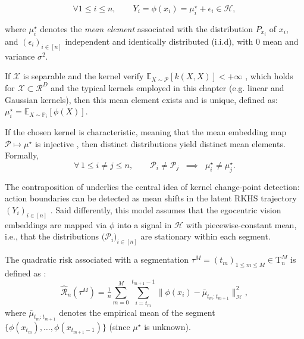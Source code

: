         \begin{equation}
            \forall 1 \leq i \leq n, \qquad Y_i = \phi(x_i) = \mu_i^\star + \epsilon_i \in \mathcal{H},
            \label{eq:latent_modeling}
        \end{equation}

        where $\mu_i^\star$ denotes the \textit{mean element} associated with the distribution $P_{x_i}$ of $x_i$, and $(\epsilon_i)_{i \in [n]}$ independent and identically distributed (i.i.d), with 0 mean and variance $\sigma^2$.

        If $\mathcal{X}$ is separable and the kernel verify $\mathbb{E}_{X \sim \mathcal{P}}[k(X,X)] < +\infty$ \cite{Ledoux1991}, which holds for $\mathcal{X} \subset \mathcal{R}^D$ and the typical kernels employed in this chapter (e.g. linear and Gaussian kernels), then this mean element exists and is unique, defined as: $\mu^\star_i = \mathbb{E}_{X \sim \mathbb{P}_{i}}[\phi(X)]$.   

        If the chosen kernel is characteristic, meaning that the mean embedding map $\mathcal{P} \mapsto \mu^\star$ is injective \cite{Sriperumbudur}, then distinct distributions yield distinct mean elements. Formally,
        \begin{equation}
            \forall\, 1 \leq i \neq j \leq n, 
            \qquad \mathcal{P}_{i} \neq \mathcal{P}_{j} 
            \;\; \implies \;\; \mu^\star_i \neq \mu^\star_j.
            \label{eq:injective}
        \end{equation}

        The contraposition of  underlies the central idea of kernel change-point detection: action boundaries can be detected as mean shifts in the latent RKHS trajectory $(Y_i)_{i \in [n]}$ \cite{cpt}. Said differently, this model assumes that the egocentric vision embeddings are mapped via $\phi$ into a signal in $\mathcal{H}$ with piecewise-constant mean, i.e., that the distributions $\big(\mathcal{P}_i \big)_{i \in [n]}$ are stationary within each segment.


        The quadratic risk associated with a segmentation $\tau^{M} = (t_m)_{1 \leq m \leq M} \in \mathrm{T}_n^M$ is defined as \cite{4301363}:
        \begin{equation}
            \hat{\mathcal{R}}_n(\tau^{M}) 
            = \tfrac{1}{n}\sum_{m=0}^M \sum_{i=t_m}^{t_{m+1}-1} 
            \big\| \phi(x_i) - \bar{\mu}_{t_m:t_{m+1}} \big\|_{\mathcal{H}}^2,
            \label{eq:opti}
        \end{equation}
        where $\bar{\mu}_{t_m:t_{m+1}}$ denotes the empirical mean of the segment $\{\phi(x_{t_m}), \ldots, \phi(x_{t_{m+1}-1})\}$ (since $\mu^\star$ is unknown). 
        
